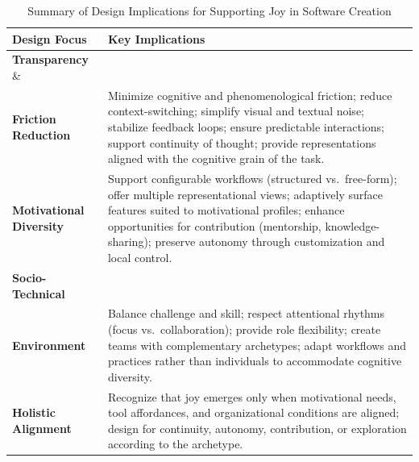 \documentclass[12pt]{elsarticle}
\begin{document}
\begin{table}[t]
\centering
\caption{Summary of Design Implications for Supporting Joy in Software Creation}
\label{tab:design-implications}
\renewcommand{\arraystretch}{1.25}
\footnotesize
\begin{tabularx}{\linewidth}{lX}
\hline
\textbf{Design Focus} & \textbf{Key Implications} \\
\hline

\textbf{Transparency} \&\\ \textbf{Friction Reduction} & Minimize cognitive and phenomenological friction; reduce context-switching; simplify visual and textual noise; stabilize feedback loops; ensure predictable interactions; support continuity of thought; provide representations aligned with the cognitive grain of the task. \\

\textbf{Motivational Diversity} &
Support configurable workflows (structured vs.\ free-form); offer multiple 
representational views; adaptively surface features suited to motivational 
profiles; enhance opportunities for contribution (mentorship, 
knowledge-sharing); preserve autonomy through customization and local control. \\

\textbf{Socio-Technical} \\ \textbf{Environment} &
Balance challenge and skill; respect attentional rhythms (focus vs.\ 
collaboration); provide role flexibility; create teams with complementary 
archetypes; adapt workflows and practices rather than individuals to 
accommodate cognitive diversity. \\

\textbf{Holistic Alignment} &
Recognize that joy emerges only when motivational needs, tool affordances, and 
organizational conditions are aligned; design for continuity, autonomy, 
contribution, or exploration according to the archetype. \\
\hline
\end{tabularx}
\end{table}
\end{document}
